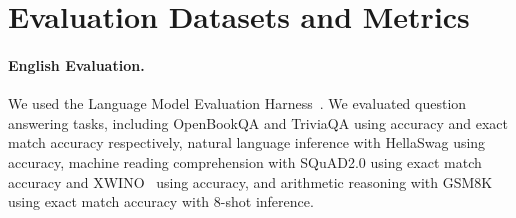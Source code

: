 \section{Evaluation Datasets and Metrics}

\label{ap:eval_dataset}



\paragraph{English Evaluation.}
We used the Language Model Evaluation Harness~\citep{leo_gao_2022_7413426_lm-evaluation-harness}. We evaluated question answering tasks, including OpenBookQA \citep{mihaylov-etal-2018-openbookqa} and TriviaQA \citep{joshi-etal-2017-triviaqa} using accuracy and exact match accuracy respectively, natural language inference with HellaSwag \citep{zellers-etal-2019-hellaswag} using accuracy, machine reading comprehension with SQuAD2.0 \citep{DBLP:conf/acl/RajpurkarJL18-squad2} using exact match accuracy and XWINO~\citep{DBLP:conf/acl/TikhonovR21-xwino} using accuracy, and arithmetic reasoning with GSM8K \citep{DBLP:journals/corr/cobbe-abs-2021-gsm8k} using exact match accuracy with 8-shot inference. 



